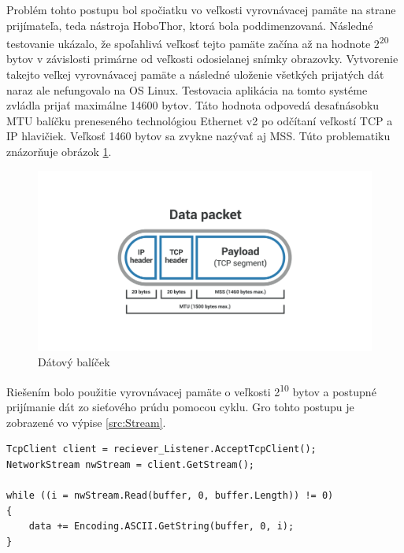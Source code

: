 \documentclass[slovak, bachelorpractice]{diploma}
\begin{document}
Problém tohto postupu bol spočiatku vo veľkosti vyrovnávacej pamäte na strane prijímateľa, teda nástroja HoboThor, ktorá bola poddimenzovaná. Následné testovanie ukázalo, že spoľahlivá veľkosť tejto pamäte začína až na hodnote 2\textsuperscript{20} bytov v závislosti primárne od veľkosti odosielanej snímky obrazovky. Vytvorenie takejto veľkej vyrovnávacej pamäte a následné uloženie všetkých prijatých dát naraz ale nefungovalo na OS Linux. Testovacia aplikácia na tomto systéme zvládla prijať maximálne 14600 bytov. Táto hodnota odpovedá desaťnásobku MTU balíčku preneseného technológiou Ethernet v2 po odčítaní veľkostí TCP a IP hlavičiek. Veľkosť 1460 bytov sa zvykne nazývať aj MSS. Túto problematiku znázorňuje obrázok \ref{pic:Packet}.
\vspace{-50pt}
\begin{figure}[!htbp]
	\centering
	\includegraphics[width=1\textwidth]{Pictures/packet.png}
	\vspace{-60pt}
	\caption[Dátový balíček]{Dátový balíček \cite{MSS}}
	\label{pic:Packet}
\end{figure}

Riešením bolo použitie vyrovnávacej pamäte o veľkosti 2\textsuperscript{10} bytov a postupné prijímanie dát zo sieťového prúdu pomocou cyklu. Gro tohto postupu je zobrazené vo výpise \ref{src:Stream}.
\vspace{10pt}
\begin{lstlisting}[label=src:Stream,caption={Postupné čítanie dát zo sieťového prúdu}]
TcpClient client = reciever_Listener.AcceptTcpClient();
NetworkStream nwStream = client.GetStream();

while ((i = nwStream.Read(buffer, 0, buffer.Length)) != 0)
{
    data += Encoding.ASCII.GetString(buffer, 0, i);
}
\end{lstlisting}
\vspace{5pt}
\end{document}
